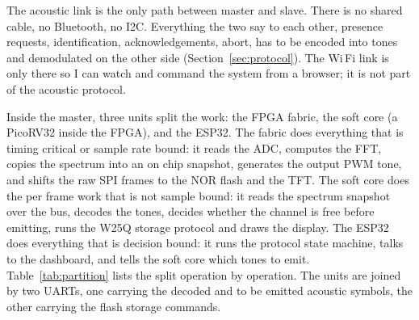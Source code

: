 \documentclass[a4paper,11pt]{article}
\begin{document}
The acoustic link is the only path between master and slave. There is no shared
cable, no Bluetooth, no I2C. Everything the two say to each other, presence
requests, identification, acknowledgements, abort, has to be encoded into tones
and demodulated on the other side (Section~\ref{sec:protocol}). The Wi\,Fi link is
only there so I can watch and command the system from a browser; it is not part of
the acoustic protocol.

Inside the master, three units split the work: the FPGA fabric, the soft core (a
PicoRV32 inside the FPGA), and the ESP32. The fabric does everything that is timing
critical or sample rate bound: it reads the ADC, computes the FFT, copies the spectrum into an on chip snapshot, generates the output PWM tone, and shifts the raw
SPI frames to the NOR flash and the TFT. The soft core does the per frame work that
is not sample bound: it reads the spectrum snapshot over the bus, decodes the tones,
decides whether the channel is free before emitting, runs the W25Q storage protocol
and draws the display. The ESP32 does everything that is decision bound: it
runs the protocol state machine, talks to the dashboard, and tells the soft core
which tones to emit. Table~\ref{tab:partition} lists the split operation by operation.
The units are joined by two UARTs, one carrying the decoded and to be emitted acoustic
symbols, the other carrying the flash storage commands.
\end{document}
